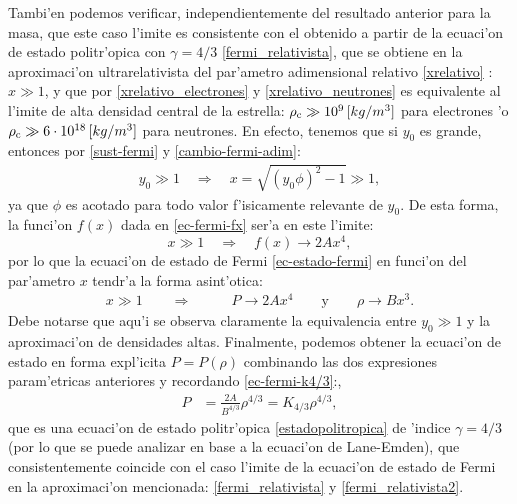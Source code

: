 Tambi'en podemos verificar, independientemente del resultado anterior para la masa, que este caso l'imite es consistente con el obtenido a partir de la ecuaci'on de estado politr'opica con $\gamma=4/3$ \eqref{fermi_relativista}, que se obtiene en la aproximaci'on ultrarelativista del par'ametro adimensional relativo \eqref{xrelativo} : $x\gg1$, y que por \eqref{xrelativo_electrones} y \eqref{xrelativo_neutrones} es equivalente al l'imite de alta densidad central de la estrella: $\rho_{\rm c}\gg10^{9}\,[kg/m^3]$ para electrones 'o $\rho_{\rm c}\gg6\cdot10^{18}\,[kg/m^3]$ para neutrones. En efecto,  tenemos que si $y_0$ es grande, entonces por \eqref{sust-fermi} y \eqref{cambio-fermi-adim}:
\begin{align}
y_0\gg 1\quad\Rightarrow\quad x=\sqrt{(y_0\phi)^2-1}\gg1,
\end{align}
ya que $\phi$ es acotado para todo valor f'isicamente relevante de $y_0$. De esta forma,  la funci'on $f(x)$ dada en \eqref{ec-fermi-fx} ser'a en este l'imite:
\begin{equation}
 x\gg1\quad\Rightarrow\quad f(x)\to 2Ax^4,
\end{equation}
por lo que la ecuaci'on de estado de Fermi \eqref{ec-estado-fermi} en funci'on del par'ametro $x$ tendr'a la forma asint'otica:
\begin{align}
 x\gg 1\qquad\Rightarrow\qquad &P\to 2Ax^4\qquad\text{y} \qquad\rho\to Bx^3.
\end{align}
Debe notarse que aqu'i se observa claramente la equivalencia entre $y_0\gg 1$ y la aproximaci'on de densidades altas. Finalmente, podemos obtener la ecuaci'on de estado en forma expl'icita $P=P(\rho)$ combinando las dos expresiones param'etricas anteriores y recordando \eqref{ec-fermi-k4/3}:,
\begin{align}
 P&=\frac{2A}{B^{4/3}}\rho^{4/3}=K_{4/3}\rho^{4/3},
\end{align}
que es una ecuaci'on de estado politr'opica \eqref{estadopolitropica} de 'indice $\gamma=4/3$ (por lo que se puede analizar en base a la ecuaci'on de Lane-Emden), que consistentemente coincide con el caso l'imite de la ecuaci'on de estado de Fermi en la aproximaci'on mencionada: \eqref{fermi_relativista} y \eqref{fermi_relativista2}.

